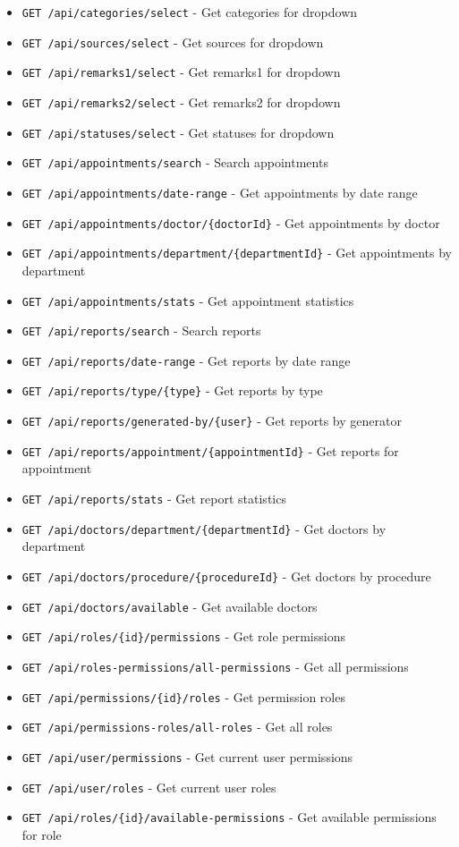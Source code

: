\documentclass[12pt,a4paper]{article}
\begin{document}
\begin{itemize}
    \item \texttt{GET /api/categories/select} - Get categories for dropdown
    \item \texttt{GET /api/sources/select} - Get sources for dropdown
    \item \texttt{GET /api/remarks1/select} - Get remarks1 for dropdown
    \item \texttt{GET /api/remarks2/select} - Get remarks2 for dropdown
    \item \texttt{GET /api/statuses/select} - Get statuses for dropdown
    \item \texttt{GET /api/appointments/search} - Search appointments
    \item \texttt{GET /api/appointments/date-range} - Get appointments by date range
    \item \texttt{GET /api/appointments/doctor/\{doctorId\}} - Get appointments by doctor
    \item \texttt{GET /api/appointments/department/\{departmentId\}} - Get appointments by department
    \item \texttt{GET /api/appointments/stats} - Get appointment statistics
    \item \texttt{GET /api/reports/search} - Search reports
    \item \texttt{GET /api/reports/date-range} - Get reports by date range
    \item \texttt{GET /api/reports/type/\{type\}} - Get reports by type
    \item \texttt{GET /api/reports/generated-by/\{user\}} - Get reports by generator
    \item \texttt{GET /api/reports/appointment/\{appointmentId\}} - Get reports for appointment
    \item \texttt{GET /api/reports/stats} - Get report statistics
    \item \texttt{GET /api/doctors/department/\{departmentId\}} - Get doctors by department
    \item \texttt{GET /api/doctors/procedure/\{procedureId\}} - Get doctors by procedure
    \item \texttt{GET /api/doctors/available} - Get available doctors
    \item \texttt{GET /api/roles/\{id\}/permissions} - Get role permissions
    \item \texttt{GET /api/roles-permissions/all-permissions} - Get all permissions
    \item \texttt{GET /api/permissions/\{id\}/roles} - Get permission roles
    \item \texttt{GET /api/permissions-roles/all-roles} - Get all roles
    \item \texttt{GET /api/user/permissions} - Get current user permissions
    \item \texttt{GET /api/user/roles} - Get current user roles
    \item \texttt{GET /api/roles/\{id\}/available-permissions} - Get available permissions for role
\end{itemize}
\end{document}
